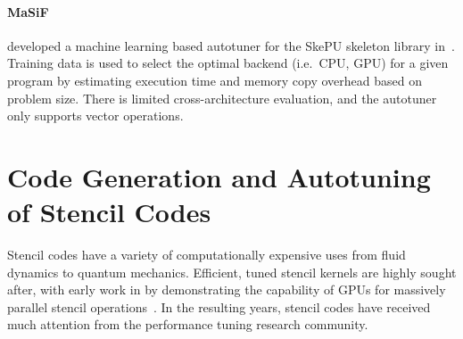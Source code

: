 
%
\paragraph{MaSiF} 


\citeauthor{Dastgeer2011} developed a machine learning based autotuner
for the SkePU skeleton library in~\cite{Dastgeer2011}. Training data
is used to select the optimal backend (i.e.\ CPU, GPU) for a given
program by estimating execution time and memory copy overhead based on
problem size. There is limited cross-architecture evaluation, and the
autotuner only supports vector operations.



\section{Code Generation and Autotuning of Stencil Codes}

Stencil codes have a variety of computationally expensive uses from
fluid dynamics to quantum mechanics. Efficient, tuned stencil kernels
are highly sought after, with early work in \citeyear{Bolz2003} by
\citeauthor{Bolz2003} demonstrating the capability of GPUs for
massively parallel stencil operations~\cite{Bolz2003}. In the
resulting years, stencil codes have received much attention from the
performance tuning research community.

